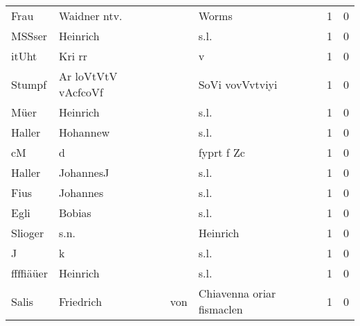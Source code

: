 \begin{center}
\begin{tiny}
\begin{longtabu}{llllrr}
                     Frau &                       Waidner ntv. &             &                                       Worms &          1 &         0 \\
                   MSSser &                           Heinrich &             &                                        s.l. &          1 &         0 \\
                    itUht &                             Kri rr &             &                                           v &          1 &         0 \\
                   Stumpf &                Ar loVtVtV vAcfcoVf &             &                             SoVi vovVvtviyi &          1 &         0 \\
                     Müer &                           Heinrich &             &                                        s.l. &          1 &         0 \\
                   Haller &                           Hohannew &             &                                        s.l. &          1 &         0 \\
                       cM &                                  d &             &                                  fyprt f Zc &          1 &         0 \\
                   Haller &                          JohannesJ &             &                                        s.l. &          1 &         0 \\
                     Fius &                           Johannes &             &                                        s.l. &          1 &         0 \\
                     Egli &                             Bobias &             &                                        s.l. &          1 &         0 \\
                  Slioger &                               s.n. &             &                                    Heinrich &          1 &         0 \\
                        J &                                  k &             &                                        s.l. &          1 &         0 \\
                ffffiäüer &                           Heinrich &             &                                        s.l. &          1 &         0 \\
                    Salis &                          Friedrich &         von &                   Chiavenna oriar fismaclen &          1 &         0 \\

\end{longtabu}
\end{tiny}
\end{center}
